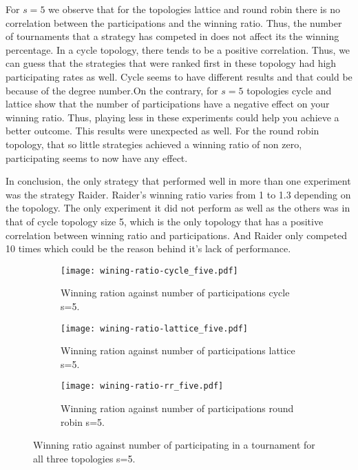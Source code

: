 For \(s=5\) we observe that for the topologies lattice and round robin there is
no correlation between the participations and the winning ratio. Thus, the
number of tournaments that a strategy has competed in does not affect its
the winning percentage. In a cycle topology, there tends to be a positive
correlation. Thus, we can
guess that the strategies that were ranked first in these topology had high
participating rates as well. Cycle seems to have different results and that could
be because of the degree number.On the contrary, for \(s=5\) topologies cycle and
lattice show that the
number of participations have a negative effect on your winning ratio. Thus, playing
less in these experiments could help you achieve a better outcome. This results
were unexpected as well. For the round robin topology, that so little strategies
achieved a winning ratio of non zero, participating seems to now have any effect.

In conclusion, the only strategy that performed well in more than one experiment
was the strategy Raider. Raider's winning ratio varies from 1 to 1.3 depending
on the topology. The only experiment it did not perform as well as the others
was in that of cycle topology size 5, which is the only topology that has a
positive correlation between winning ratio and participations. And Raider
only competed 10 times which could be the reason behind it's lack of performance.

\begin{figure}[H]
\centering

    \begin{subfigure}[t]{1\textwidth}
    \centering
        \texttt{[image: wining-ratio-cycle\_five.pdf]}
    \caption{Winning ration against number of participations cycle s=5.}
    \end{subfigure}
\hfill
    \begin{subfigure}[t]{1\textwidth}\centering
    \centering
        \texttt{[image: wining-ratio-lattice\_five.pdf]}
    \caption{Winning ration against number of participations lattice s=5.}
    \end{subfigure}
\hfill
    \begin{subfigure}[t]{1\textwidth}\centering
    \centering
        \texttt{[image: wining-ratio-rr\_five.pdf]}
    \caption{Winning ration against number of participations round robin s=5.}
    \end{subfigure}
\caption{Winning ratio against number of participating in a tournament
         for all three topologies s=5.}
\label{fig:winning-ratio-five}
\end{figure}

